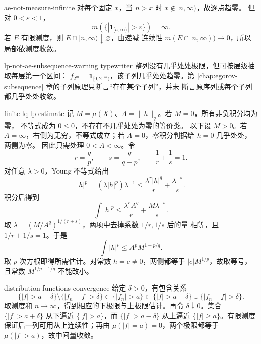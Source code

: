 \begin{solution}{ae-not-measure-infinite}
对每个固定 \(x\)，当 \(n>x\) 时 \(x\notin[n,\infty)\)，故逐点趋零。
但对 \(0<\varepsilon<1\)，
\[
 m(\{|\mathbf1_{[n,\infty)}|>\varepsilon\})=\infty.
\]
若 \(E\) 有限测度，则 \(E\cap[n,\infty)\downarrow\varnothing\)，由递减
连续性 \(m(E\cap[n,\infty))\to0\)，所以局部依测度收敛。
\end{solution}

\begin{solution}{lp-not-ae-subsequence-warning}
typewriter 整列没有几乎处处极限，但可按层级抽取每层第一个区间：
\(f_{2^m}=\mathbf1_{[0,2^{-m})}\)，该子列几乎处处趋零。第
\ref{chap:egorov-subsequence} 章的子列原理只断言“存在某个子列”，并未
断言原序列或每个子列都几乎处处收敛。
\end{solution}

\begin{solution}{finite-lq-lp-estimate}
记 \(M=\mu(X)\)、\(A=\|h\|_q\)。若 \(M=0\)，所有非负积分均为零，
不等式成为 \(0\le0\)，不存在不几乎处处为零的等价类。
以下设 \(M>0\)。若 \(A=\infty\)，右侧为无穷，不等式成立；若
\(A=0\)，零积分判据给 \(h=0\) 几乎处处，两侧为零。
因此只需处理 \(0<A<\infty\)。令
\[
 r=\frac qp,\qquad s=\frac q{q-p},\qquad \frac1r+\frac1s=1.
\]
对任意 \(\lambda>0\)，Young 不等式给出
\[
 |h|^p=(\lambda|h|^p)\lambda^{-1}
 \le \frac{\lambda^r|h|^q}{r}+\frac{\lambda^{-s}}s.
\]
积分后得到
\[
 \int|h|^p\le\frac{\lambda^rA^q}{r}+\frac{M\lambda^{-s}}s.
\]
取 \(\lambda=(M/A^q)^{1/(r+s)}\)，两项中去掉系数 \(1/r,1/s\) 后的量
相等，且 \(1/r+1/s=1\)。于是
\[
 \int|h|^p\le A^pM^{1-p/q}.
\]
取 \(p\) 次方根即得所需估计。对常数 \(h=c\ne0\)，两侧都等于
\(|c|M^{1/p}\)，故取等号，且常数
\(M^{1/p-1/q}\) 不能改小。
\end{solution}

\begin{solution}{distribution-functions-convergence}
给定 \(\delta>0\)，有包含关系
\[
 \{|f|>a+\delta\}\setminus\{|f_n-f|>\delta\}
 \subset\{|f_n|>a\}
\subset
 \{|f|>a-\delta\}\cup\{|f_n-f|>\delta\}.
\]
取测度和 \(n\to\infty\)，得到相应的下极限与上极限估计。再令
\(\delta\downarrow0\)。集合 \(\{|f|>a+\delta\}\) 从下逼近
\(\{|f|>a\}\)，而 \(\{|f|>a-\delta\}\) 从上逼近
\(\{|f|\ge a\}\)。有限测度保证后一列可用从上连续性；再由
\(\mu(|f|=a)=0\)，两个极限都等于 \(\mu(|f|>a)\)，故中间量收敛。
\end{solution}

